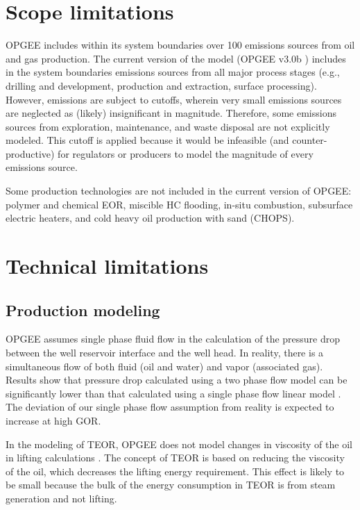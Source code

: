 \documentclass[11pt]{report}
\newcommand{\version}{v3.0b }
\begin{document}
\section{Scope limitations}

OPGEE includes within its system boundaries over 100 emissions sources from oil and gas production. The current version of the model (OPGEE \version) includes in the system boundaries emissions sources from all major process stages (e.g., drilling and development, production and extraction, surface processing). However, emissions are subject to cutoffs, wherein very small emissions sources are neglected as (likely) insignificant in magnitude. Therefore, some emissions sources from exploration, maintenance, and waste disposal are not explicitly modeled. This cutoff is applied because it would be infeasible (and counter-productive) for regulators or producers to model the magnitude of every emissions source.

Some production technologies are not included in the current version of OPGEE: polymer and chemical EOR, miscible HC flooding,  in-situ combustion, subsurface electric heaters, and cold heavy oil production with sand (CHOPS).




\section{Technical limitations}
\subsection{Production modeling}
OPGEE assumes single phase fluid flow in the calculation of the pressure drop between the well reservoir interface and the well head. In reality, there is a simultaneous flow of both fluid (oil and water) and vapor (associated gas). Results show that pressure drop calculated using a two phase flow model can be significantly lower than that calculated using a single phase flow linear model \cite{Clegg2007}. The deviation of our single phase flow assumption from reality is expected to increase at high GOR. \par

In the modeling of TEOR, OPGEE does not model changes in viscosity of the oil in lifting calculations \cite{Green1998}. The concept of TEOR is based on reducing the viscosity of the oil, which decreases the lifting energy requirement. This effect is likely to be small because the bulk of the energy consumption in TEOR is from steam generation and not lifting.\par
\end{document}

